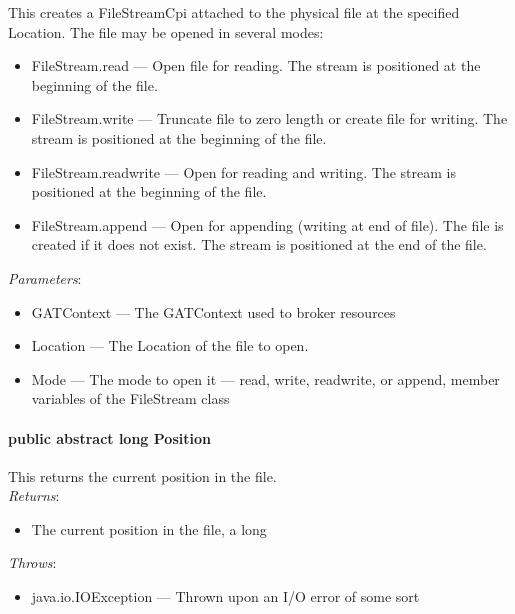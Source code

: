 \documentclass[$Date: 2003/06/26 19:29:31 $]{glabarticle}
\begin{document}
This creates a FileStreamCpi attached to the physical file at the
specified Location.  The file may be opened in several modes:

\begin{itemize}

\item[] FileStream.read --- Open file for reading.  The stream is
positioned at the beginning of the file.

\item[] FileStream.write --- Truncate file to zero length or create file
for writing.  The stream is positioned at the beginning of the file.

\item[] FileStream.readwrite --- Open for reading and writing.  The
stream is positioned at the beginning of the file.

\item[] FileStream.append --- Open for appending (writing at end of
file).  The file is created if it does not exist.  The stream is
positioned at the end of the file.\\

\end{itemize}

\textit{Parameters}:
\begin{itemize}
\item[] GATContext --- The GATContext used to broker resources
\item[] Location --- The Location of the file to open.
\item[] Mode --- The mode to open it --- read, write, readwrite, or append, member variables of the FileStream class
\end{itemize}

\paragraph{public abstract long Position}

This returns the current position in the file.\\

\textit{Returns}:
\begin{itemize}
\item[] The current position in the file, a long
\end{itemize}

\textit{Throws}:
\begin{itemize}
\item[]  java.io.IOException --- Thrown upon an I/O error of some sort
\end{itemize}
\end{document}
